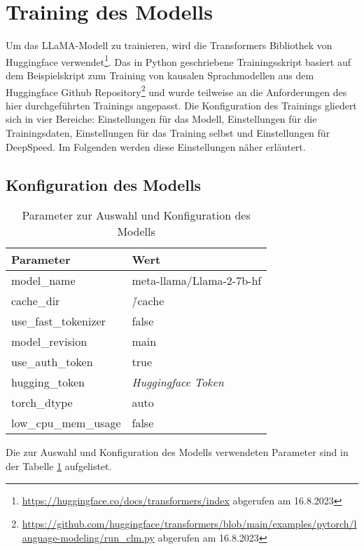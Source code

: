 \section{Training des Modells}
Um das LLaMA-Modell zu trainieren, wird die Transformers Bibliothek von Huggingface verwendet\footnote{\url{https://huggingface.co/docs/transformers/index} abgerufen am 16.8.2023}.
Das in Python geschriebene Trainingsskript basiert auf dem Beispielskript zum Training von kausalen Sprachmodellen aus dem Huggingface Github Repository\footnote{\url{https://github.com/huggingface/transformers/blob/main/examples/pytorch/language-modeling/run_clm.py} abgerufen am 16.8.2023} und wurde teilweise an die Anforderungen des hier durchgeführten Trainings angepasst.
Die Konfiguration des Trainings gliedert sich in vier Bereiche: Einstellungen für das Modell, Einstellungen für die Trainingsdaten, Einstellungen für das Training selbst und Einstellungen für DeepSpeed.
Im Folgenden werden diese Einstellungen näher erläutert.
\subsection{Konfiguration des Modells}
\begin{table}
    \centering
    \begin{tabular}{ll}
        \toprule
        \textbf{Parameter} & \textbf{Wert} \\
        \midrule
        model\_name & meta-llama/Llama-2-7b-hf \\
        cache\_dir & \./cache \\
        use\_fast\_tokenizer & false \\
        model\_revision & main \\
        use\_auth\_token & true \\
        hugging\_token & \textit{Huggingface Token} \\
        torch\_dtype & auto \\
        low\_cpu\_mem\_usage & false \\
    \end{tabular}
    \caption{Parameter zur Auswahl und Konfiguration des Modells}\label{tab:model-config}
\end{table}
Die zur Auswahl und Konfiguration des Modells verwendeten Parameter sind in der Tabelle \ref{tab:model-config} aufgelistet.\\

